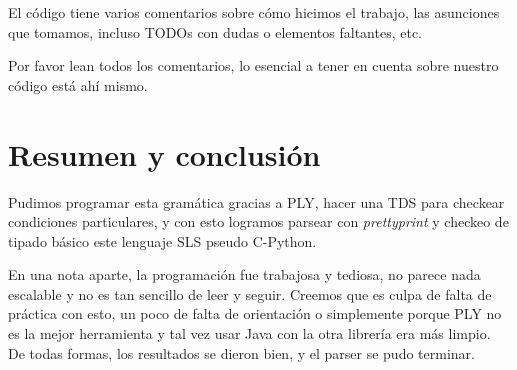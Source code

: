 El código tiene varios comentarios sobre cómo hicimos el trabajo, las asunciones que tomamos, incluso TODOs con dudas o elementos faltantes, etc.

Por favor lean todos los comentarios, lo esencial a tener en cuenta sobre nuestro código está ahí mismo.

\section{Resumen y conclusión}

Pudimos programar esta gramática gracias a PLY, hacer una TDS para checkear condiciones particulares, y con esto logramos parsear con \textit{prettyprint} y checkeo de tipado básico este lenguaje SLS pseudo C-Python.

En una nota aparte, la programación fue trabajosa y tediosa, no parece nada escalable y no es tan sencillo de leer y seguir. Creemos que es culpa de falta de práctica con esto, un poco de falta de orientación o simplemente porque PLY no es la mejor herramienta y tal vez usar Java con la otra librería era más limpio. De todas formas, los resultados se dieron bien, y el parser se pudo terminar.